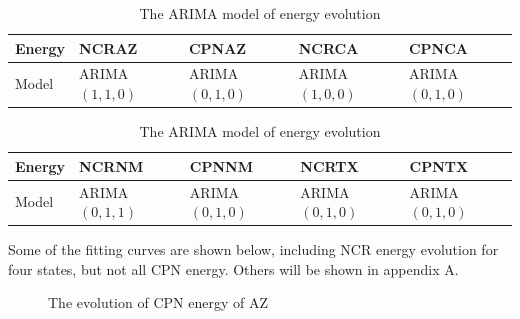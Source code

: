 \documentclass{mcmthesis}
\begin{document}
\begin{table}[!ht]
\caption{The ARIMA model of energy evolution}
 \renewcommand\arraystretch{1.5}
 \setlength{\abovecaptionskip}{0pt}%
\setlength{\belowcaptionskip}{10pt}%
\begin{center}
\begin{tabular}{p{}p{}p{}p{}p{}}
\toprule[1.5pt]
Energy & NCRAZ & CPNAZ & NCRCA & CPNCA \\
 \midrule

 Model & ARIMA$(1,1,0)$ & ARIMA$(0,1,0)$ & ARIMA$(1,0,0)$ & ARIMA$(0,1,0)$ \\

 \bottomrule[1.5pt]
 \end{tabular}
 
 \begin{tabular}{p{}p{}p{}p{}p{}}
\toprule[1.5pt]
Energy & NCRNM & CPNNM & NCRTX & CPNTX \\
 \midrule

 Model & ARIMA$(0,1,1)$ & ARIMA$(0,1,0)$ & ARIMA$(0,1,0)$ & ARIMA$(0,1,0)$ \\

 \bottomrule[1.5pt]
 \end{tabular}
 
 \end{center} 
 \end{table}

Some of the fitting curves are shown below, including NCR energy evolution for four states, but not all CPN energy. Others will be shown in appendix A.

\begin{figure}[H]
  \caption{The evolution of CPN energy of AZ}\label{figure5}
\end{figure}
\end{document}
